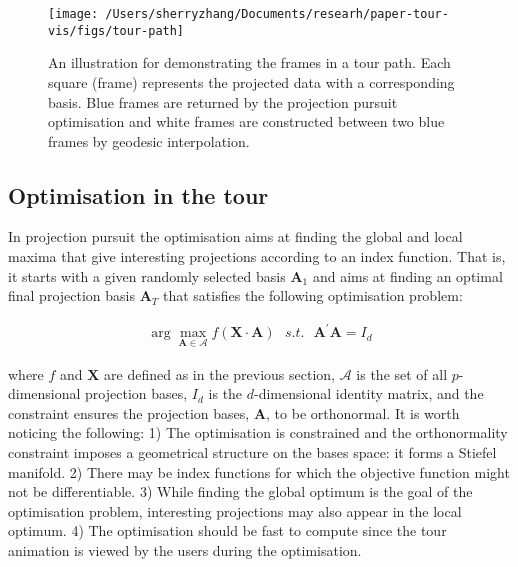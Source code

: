 \begin{Schunk}
\begin{figure}

{\centering \texttt{[image: /Users/sherryzhang/Documents/researh/paper-tour-vis/figs/tour-path]} 

}

\caption[An illustration for demonstrating the frames in a tour path]{An illustration for demonstrating the frames in a tour path. Each square (frame) represents the projected data with a corresponding basis. Blue frames are returned by the projection pursuit optimisation and white frames are constructed between two blue frames by geodesic interpolation.}\label{fig:tour-path}
\end{figure}
\end{Schunk}

\hypertarget{tour-optim}{%
\subsection{Optimisation in the tour}\label{tour-optim}}

In projection pursuit the optimisation aims at finding the global and
local maxima that give interesting projections according to an index
function. That is, it starts with a given randomly selected basis
\(\mathbf{A}_1\) and aims at finding an optimal final projection basis
\(\mathbf{A}_T\) that satisfies the following optimisation problem:

\begin{align}
\arg \max_{\mathbf{A} \in \mathcal{A}} f(\mathbf{X} \cdot \mathbf{A})  ~~~ s.t. ~~~ \mathbf{A}^{\prime} \mathbf{A} = I_d
\end{align}

\noindent where \(f\) and \(\mathbf{X}\) are defined as in the previous
section, \(\mathcal{A}\) is the set of all \(p\)-dimensional projection
bases, \(I_d\) is the \(d\)-dimensional identity matrix, and the
constraint ensures the projection bases, \(\mathbf{A}\), to be
orthonormal. It is worth noticing the following: 1) The optimisation is
constrained and the orthonormality constraint imposes a geometrical
structure on the bases space: it forms a Stiefel manifold. 2) There may
be index functions for which the objective function might not be
differentiable. 3) While finding the global optimum is the goal of the
optimisation problem, interesting projections may also appear in the
local optimum. 4) The optimisation should be fast to compute since the
tour animation is viewed by the users during the optimisation.

